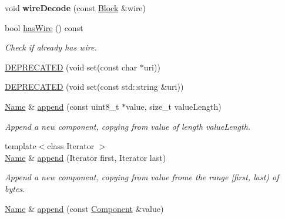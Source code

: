 \begin{DoxyCompactItemize}
\item 
void {\bfseries wire\+Decode} (const \hyperlink{classndn_1_1Block}{Block} \&wire)\hypertarget{classndn_1_1Name_ae8d420f53d44053a99504491b610d726}{}\label{classndn_1_1Name_ae8d420f53d44053a99504491b610d726}

\item 
bool \hyperlink{classndn_1_1Name_aab4e8e2eb988fe07c698b04f7cba31f1}{has\+Wire} () const\hypertarget{classndn_1_1Name_aab4e8e2eb988fe07c698b04f7cba31f1}{}\label{classndn_1_1Name_aab4e8e2eb988fe07c698b04f7cba31f1}

\begin{DoxyCompactList}\small\item\em Check if already has wire. \end{DoxyCompactList}\item 
\hyperlink{classndn_1_1Name_ab6e3f77dc49d88866a1fad4947b28ea5}{D\+E\+P\+R\+E\+C\+A\+T\+ED} (void set(const char $\ast$uri))
\item 
\hyperlink{classndn_1_1Name_aa3ebb6c6a93840ec81c44f5985092d69}{D\+E\+P\+R\+E\+C\+A\+T\+ED} (void set(const std\+::string \&uri))
\item 
\hyperlink{classndn_1_1Name}{Name} \& \hyperlink{classndn_1_1Name_ac194a91c79fc0546b796d159416ab7de}{append} (const uint8\+\_\+t $\ast$value, size\+\_\+t value\+Length)
\begin{DoxyCompactList}\small\item\em Append a new component, copying from value of length value\+Length. \end{DoxyCompactList}\item 
{\footnotesize template$<$class Iterator $>$ }\\\hyperlink{classndn_1_1Name}{Name} \& \hyperlink{classndn_1_1Name_a494df44d9d3b8fc27f1be46c9bc2db35}{append} (Iterator first, Iterator last)
\begin{DoxyCompactList}\small\item\em Append a new component, copying from value frome the range \mbox{[}{\ttfamily first}, {\ttfamily last}) of bytes. \end{DoxyCompactList}\item 
\hyperlink{classndn_1_1Name}{Name} \& \hyperlink{classndn_1_1Name_a6601023b68a042650947044198ef9889}{append} (const \hyperlink{classndn_1_1name_1_1Component}{Component} \&value)\hypertarget{classndn_1_1Name_a6601023b68a042650947044198ef9889}{}\label{classndn_1_1Name_a6601023b68a042650947044198ef9889}


\end{DoxyCompactItemize}

